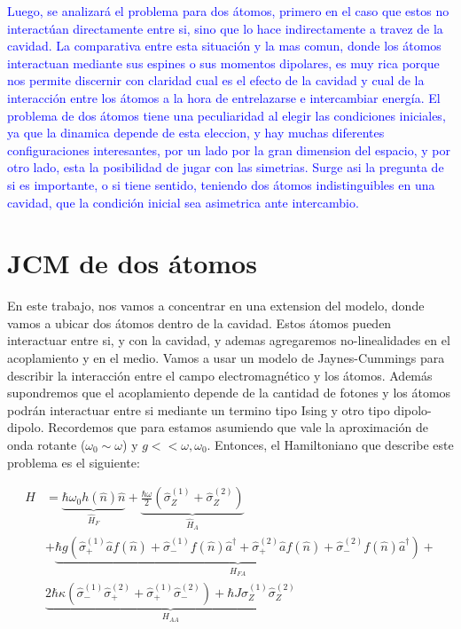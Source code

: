 \textcolor{blue}{Luego, se analizar\'a el problema para dos átomos, primero en el caso que estos no interact\'uan
directamente entre si, sino que lo hace indirectamente a travez de la cavidad. La comparativa entre
esta situación y la mas comun, donde los átomos interactuan mediante sus espines o sus momentos
dipolares, es muy rica porque nos permite discernir con claridad cual es el efecto de la cavidad
y cual de la interacción entre los átomos a la hora de entrelazarse e intercambiar energía.
El problema de dos átomos tiene una peculiaridad al elegir las condiciones iniciales, ya que la
dinamica depende de esta eleccion, y hay muchas diferentes configuraciones interesantes, por un lado
por la gran dimension del espacio, y por otro lado, esta la posibilidad de jugar con las simetrias.
Surge asi la pregunta de si es importante, o si tiene sentido, teniendo dos átomos indistinguibles
en una cavidad, que la condición inicial sea asimetrica ante intercambio. 
}

\section{JCM de dos átomos}
En este trabajo, nos vamos a concentrar en una extension del modelo, donde vamos a ubicar dos átomos dentro de la cavidad. Estos átomos pueden interactuar entre si, y con la cavidad, y ademas agregaremos no-linealidades en el acoplamiento y en el medio.
Vamos a usar un modelo de Jaynes-Cummings para describir la interacci\'on entre el campo electromagn\'etico y los átomos. Adem\'as supondremos que el acoplamiento depende de la cantidad de fotones y los átomos podr\'an interactuar entre si mediante un termino tipo Ising y otro tipo dipolo-dipolo. Recordemos que para estamos asumiendo que vale la aproximaci\'on de onda rotante ($\omega_0 \sim \omega$) y $g << \omega,\omega_0$.
Entonces, el Hamiltoniano que describe este problema es el siguiente:

\begin{equation}
\begin{split}
     \hat H & =\underbrace{\hbar \omega_0 h(\hat n) \hat n }_{\hat H_F}+\underbrace{\frac{\hbar \omega}{2}(\hat\sigma_Z^{(1)}+\hat\sigma_Z^{(2)})}_{\hat H_A}   \\ 
     & + \underbrace{\hbar g(\hat\sigma_+^{(1)}\hat a f(\hat n)+\hat\sigma_-^{(1)}f(\hat n) \hat a^\dagger + \hat\sigma_+^{(2)}\hat a f(\hat n)+\hat\sigma_-^{(2)}f(\hat n) \hat a^\dagger)}_{H_{FA}} + \\ & \underbrace{2\hbar \kappa (\hat \sigma_-^{(1)}\hat \sigma_+^{(2)}+\hat \sigma_+^{(1)}\hat \sigma_-^{(2)}) + \hbar J \hat \sigma_Z^{(1)}\hat \sigma_Z^{(2)}}_{H_{AA}}
\end{split}
\end{equation}

